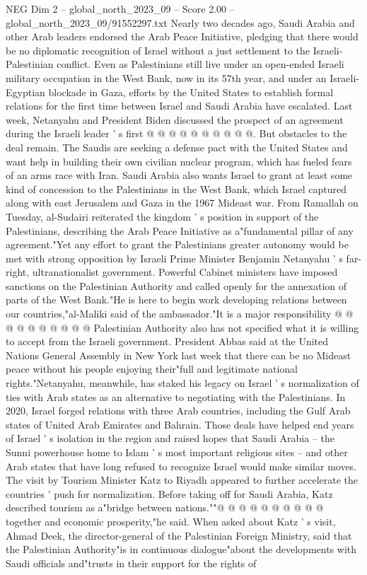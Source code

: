 \begin{textsample}{NEG Dim 2 – global\_north\_2023\_09 – Score 2.00 – global\_north\_2023\_09/91552297.txt}
Nearly two decades ago, Saudi Arabia and other Arab leaders endorsed the Arab Peace Initiative, pledging that there would be no diplomatic recognition of Israel without a just settlement to the Israeli-Palestinian conflict.
Even as Palestinians still live under an open-ended Israeli military occupation in the West Bank, now in its 57th year, and under an Israeli-Egyptian blockade in Gaza, efforts by the United States to establish formal relations for the first time between Israel and Saudi Arabia have escalated.
Last week, Netanyahu and President Biden discussed the prospect of an agreement during the Israeli leader ' s first @ @ @ @ @ @ @ @ @ @.
But obstacles to the deal remain.
The Saudis are seeking a defense pact with the United States and want help in building their own civilian nuclear program, which has fueled fears of an arms race with Iran.
Saudi Arabia also wants Israel to grant at least some kind of concession to the Palestinians in the West Bank, which Israel captured along with east Jerusalem and Gaza in the 1967 Mideast war.
From Ramallah on Tuesday, al-Sudairi reiterated the kingdom ' s position in support of the Palestinians, describing the Arab Peace Initiative as a"fundamental pillar of any agreement."Yet any effort to grant the Palestinians greater autonomy would be met with strong opposition by Israeli Prime Minister Benjamin Netanyahu ' s far-right, ultranationalist government.
Powerful Cabinet ministers have imposed sanctions on the Palestinian Authority and called openly for the annexation of parts of the West Bank."He is here to begin work developing relations between our countries,"al-Maliki said of the ambassador."It is a major responsibility @ @ @ @ @ @ @ @ @ @ Palestinian Authority also has not specified what it is willing to accept from the Israeli government.
President Abbas said at the United Nations General Assembly in New York last week that there can be no Mideast peace without his people enjoying their"full and legitimate national rights."Netanyahu, meanwhile, has staked his legacy on Israel ' s normalization of ties with Arab states as an alternative to negotiating with the Palestinians.
In 2020, Israel forged relations with three Arab countries, including the Gulf Arab states of United Arab Emirates and Bahrain.
Those deals have helped end years of Israel ' s isolation in the region and raised hopes that Saudi Arabia -- the Sunni powerhouse home to Islam ' s most important religious sites -- and other Arab states that have long refused to recognize Israel would make similar moves.
The visit by Tourism Minister Katz to Riyadh appeared to further accelerate the countries ' push for normalization.
Before taking off for Saudi Arabia, Katz described tourism as a"bridge between nations.""@ @ @ @ @ @ @ @ @ @ together and economic prosperity,"he said.
When asked about Katz ' s visit, Ahmad Deek, the director-general of the Palestinian Foreign Ministry, said that the Palestinian Authority"is in continuous dialogue"about the developments with Saudi officials and"trusts in their support for the rights of

\end{textsample}

